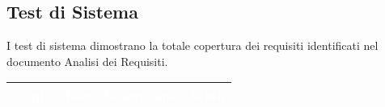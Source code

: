 \subsection{Test di Sistema}
\raggedright{I test di sistema dimostrano la totale copertura dei requisiti identificati nel documento Analisi dei Requisiti.} \\
{
    \setlength{\freewidth}{\dimexpr\textwidth-10\tabcolsep}
    \renewcommand{\arraystretch}{1.5}
    \centering
    \setlength{\aboverulesep}{0pt}
    \setlength{\belowrulesep}{0pt}
    \begin{longtable}{C{.3\freewidth} C{.5\freewidth} C{.3\freewidth}}
       \toprule
    \textcolor{white}{\textbf{Codice Test}}&
    \textcolor{white}{\textbf{Descrizione}}&
    \textcolor{white}{\textbf{Stato}}\\	
    \toprule
    \endhead


\end{longtable}}
